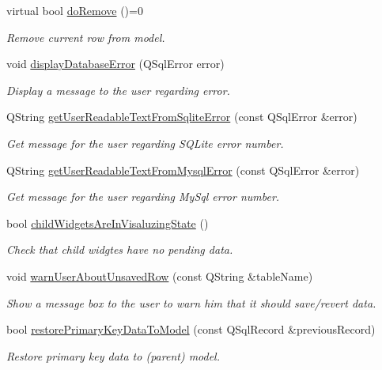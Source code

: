 \begin{DoxyCompactItemize}
virtual bool \hyperlink{classmdt_abstract_sql_widget_a41c30652fa9775c7b3bc6cb51004d4d5}{do\-Remove} ()=0
\begin{DoxyCompactList}\small\item\em Remove current row from model. \end{DoxyCompactList}\item 
void \hyperlink{classmdt_abstract_sql_widget_a3401020fed292da2c3b565a536f0be47}{display\-Database\-Error} (Q\-Sql\-Error error)
\begin{DoxyCompactList}\small\item\em Display a message to the user regarding error. \end{DoxyCompactList}\item 
Q\-String \hyperlink{classmdt_abstract_sql_widget_aeeddeec556cc20c5c9a49559df7898d9}{get\-User\-Readable\-Text\-From\-Sqlite\-Error} (const Q\-Sql\-Error \&error)
\begin{DoxyCompactList}\small\item\em Get message for the user regarding S\-Q\-Lite error number. \end{DoxyCompactList}\item 
Q\-String \hyperlink{classmdt_abstract_sql_widget_a1081ced9b96f60b3b39c6085bfe305d4}{get\-User\-Readable\-Text\-From\-Mysql\-Error} (const Q\-Sql\-Error \&error)
\begin{DoxyCompactList}\small\item\em Get message for the user regarding My\-Sql error number. \end{DoxyCompactList}\item 
bool \hyperlink{classmdt_abstract_sql_widget_aebd051866b148eb6f60a10c6ac648efa}{child\-Widgets\-Are\-In\-Visaluzing\-State} ()
\begin{DoxyCompactList}\small\item\em Check that child widgtes have no pending data. \end{DoxyCompactList}\item 
void \hyperlink{classmdt_abstract_sql_widget_ad20a178299c96790587b53380bb68282}{warn\-User\-About\-Unsaved\-Row} (const Q\-String \&table\-Name)
\begin{DoxyCompactList}\small\item\em Show a message box to the user to warn him that it should save/revert data. \end{DoxyCompactList}\item 
bool \hyperlink{classmdt_abstract_sql_widget_ac93226881ba03311a6a95ecd2ddaa003}{restore\-Primary\-Key\-Data\-To\-Model} (const Q\-Sql\-Record \&previous\-Record)
\begin{DoxyCompactList}\small\item\em Restore primary key data to (parent) model. \end{DoxyCompactList}\end{DoxyCompactItemize}


